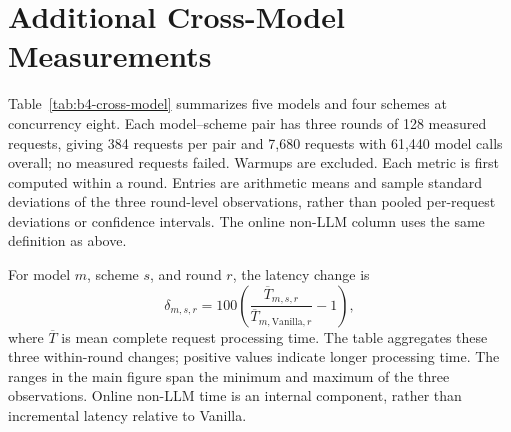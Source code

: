 \section{Additional Cross-Model Measurements}
\label{app:b4-cross-model}
Table~\ref{tab:b4-cross-model} summarizes five models and four schemes at
concurrency eight. Each model--scheme pair has three rounds of 128 measured
requests, giving 384 requests per pair and 7,680 requests with 61,440 model calls
overall; no measured requests failed. Warmups are excluded.
Each metric is first computed within a round. Entries are arithmetic means and
sample standard deviations of the three round-level observations, rather than
pooled per-request deviations or confidence intervals.
The online non-LLM column uses the same definition as above.

For model $m$, scheme $s$, and round $r$, the latency change is
\[
\delta_{m,s,r}=100\left(
\frac{\overline{T}_{m,s,r}}{\overline{T}_{m,\mathrm{Vanilla},r}}-1\right),
\]
where $\overline{T}$ is mean complete request processing time.
The table aggregates these three within-round changes; positive values indicate
longer processing time. The ranges in the main figure span the minimum and maximum
of the three observations. Online non-LLM time is an internal component, rather
than incremental latency relative to Vanilla.

